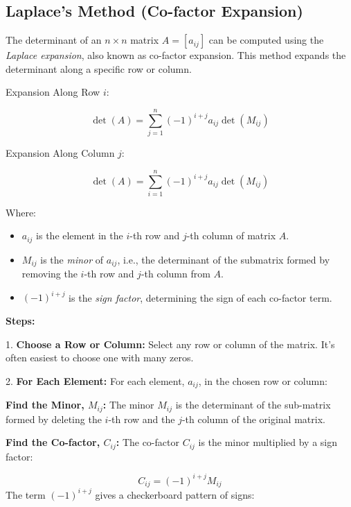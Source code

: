 \subsection{Laplace's Method (Co-factor Expansion)}

The determinant of an \( n \times n \) matrix \( A = [a_{ij}] \) can be 
computed using the \emph{Laplace expansion}, also known as co-factor expansion. 
This method expands the determinant along a specific row or column.

Expansion Along Row \(i\):

\[
    \det(A) = \sum_{j=1}^{n} {(-1)}^{i+j} a_{ij} \det(M_{ij})
\]

Expansion Along Column \(j\):

\[
    \det(A) = \sum_{i=1}^{n} {(-1)}^{i+j} a_{ij} \det(M_{ij})
\]

Where:

\begin{itemize}

    \item \( a_{ij} \) is the element in the \(i\)-th row and \(j\)-th column of matrix \(A\).

    \item \( M_{ij} \) is the \emph{minor} of \( a_{ij} \), i.e., the determinant of the submatrix formed by removing the \(i\)-th row and \(j\)-th column from \(A\).

    \item \( {(-1)}^{i+j} \) is the \emph{sign factor}, determining the sign of each co-factor term.

\end{itemize}

\textbf{Steps:}

1.\textbf{ Choose a Row or Column:} Select any row or column of the matrix.  It's often easiest to choose one with many zeros.

 2.\textbf{ For Each Element:} For each element, \(a_{ij}\), in the chosen row or column:

    \textbf{Find the Minor, \(M_{ij}\):} The minor \(M_{ij}\) is the determinant of the sub-matrix formed by deleting the 
    \indent \(i\)-th row and the \(j\)-th column of the original matrix.

    \textbf{Find the Co-factor, \(C_{ij}\):} The co-factor \(C_{ij}\) is the minor multiplied by a sign factor:
        
        \[
            C_{ij} = {(-1)}^{i+j} M_{ij}
        \]
        The term  \({(-1)}^{i+j}\)  gives a checkerboard pattern of signs:
        
